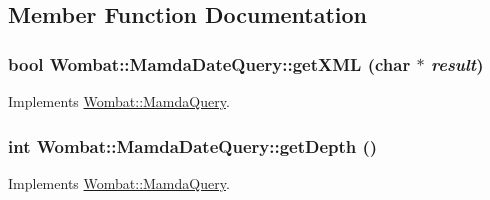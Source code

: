 \subsection{Member Function Documentation}
\hypertarget{classWombat_1_1MamdaDateQuery_8e0c342e335888cd44216830ad40a195}{
\subsubsection[getXML]{\setlength{\rightskip}{0pt plus 5cm}bool Wombat::Mamda\-Date\-Query::get\-XML (char $\ast$ {\em result})}}
\label{classWombat_1_1MamdaDateQuery_8e0c342e335888cd44216830ad40a195}




Implements \hyperlink{classWombat_1_1MamdaQuery_d5a4bbc29d9a752db0d07fa1e3aa2f25}{Wombat::Mamda\-Query}.\hypertarget{classWombat_1_1MamdaDateQuery_85e1e17ac7698588ed036ff47aa51327}{
\subsubsection[getDepth]{\setlength{\rightskip}{0pt plus 5cm}int Wombat::Mamda\-Date\-Query::get\-Depth ()}}
\label{classWombat_1_1MamdaDateQuery_85e1e17ac7698588ed036ff47aa51327}




Implements \hyperlink{classWombat_1_1MamdaQuery_1658aee7db0fd2fce15c63293c428597}{Wombat::Mamda\-Query}.